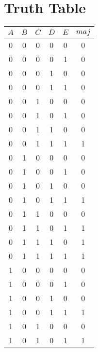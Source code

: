 \documentclass{article}
\begin{document}




\section*{Truth Table}
\begin{table}[H]
  \centering
  \begin{tabular}{ccccc|c}
    \toprule
    $A$ & $B$ & $C$ & $D$ & $E$ & $maj$ \\
    \midrule
    0   & 0   & 0   & 0   & 0   & 0     \\
    0   & 0   & 0   & 0   & 1   & 0     \\
    0   & 0   & 0   & 1   & 0   & 0     \\
    0   & 0   & 0   & 1   & 1   & 0     \\
    0   & 0   & 1   & 0   & 0   & 0     \\
    0   & 0   & 1   & 0   & 1   & 0     \\
    0   & 0   & 1   & 1   & 0   & 0     \\
    0   & 0   & 1   & 1   & 1   & 1     \\
    0   & 1   & 0   & 0   & 0   & 0     \\
    0   & 1   & 0   & 0   & 1   & 0     \\
    0   & 1   & 0   & 1   & 0   & 0     \\
    0   & 1   & 0   & 1   & 1   & 1     \\
    0   & 1   & 1   & 0   & 0   & 0     \\
    0   & 1   & 1   & 0   & 1   & 1     \\
    0   & 1   & 1   & 1   & 0   & 1     \\
    0   & 1   & 1   & 1   & 1   & 1     \\
    1   & 0   & 0   & 0   & 0   & 0     \\
    1   & 0   & 0   & 0   & 1   & 0     \\
    1   & 0   & 0   & 1   & 0   & 0     \\
    1   & 0   & 0   & 1   & 1   & 1     \\
    1   & 0   & 1   & 0   & 0   & 0     \\
    1   & 0   & 1   & 0   & 1   & 1     \\

\end{tabular}
\end{table}
\end{document}
